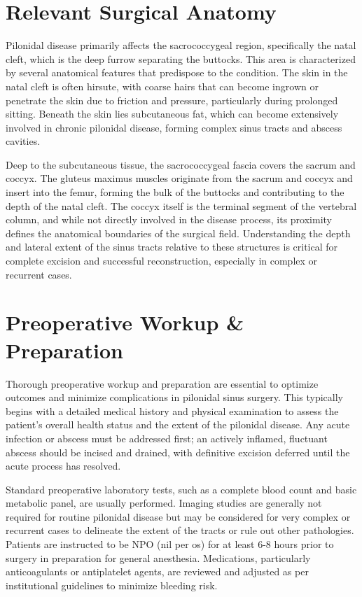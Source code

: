 \section*{Relevant Surgical Anatomy}
Pilonidal disease primarily affects the sacrococcygeal region, specifically the natal cleft, which is the deep furrow separating the buttocks. This area is characterized by several anatomical features that predispose to the condition. The skin in the natal cleft is often hirsute, with coarse hairs that can become ingrown or penetrate the skin due to friction and pressure, particularly during prolonged sitting. Beneath the skin lies subcutaneous fat, which can become extensively involved in chronic pilonidal disease, forming complex sinus tracts and abscess cavities.

Deep to the subcutaneous tissue, the sacrococcygeal fascia covers the sacrum and coccyx. The gluteus maximus muscles originate from the sacrum and coccyx and insert into the femur, forming the bulk of the buttocks and contributing to the depth of the natal cleft. The coccyx itself is the terminal segment of the vertebral column, and while not directly involved in the disease process, its proximity defines the anatomical boundaries of the surgical field. Understanding the depth and lateral extent of the sinus tracts relative to these structures is critical for complete excision and successful reconstruction, especially in complex or recurrent cases.

\section*{Preoperative Workup \& Preparation}
Thorough preoperative workup and preparation are essential to optimize outcomes and minimize complications in pilonidal sinus surgery. This typically begins with a detailed medical history and physical examination to assess the patient's overall health status and the extent of the pilonidal disease. Any acute infection or abscess must be addressed first; an actively inflamed, fluctuant abscess should be incised and drained, with definitive excision deferred until the acute process has resolved.

Standard preoperative laboratory tests, such as a complete blood count and basic metabolic panel, are usually performed. Imaging studies are generally not required for routine pilonidal disease but may be considered for very complex or recurrent cases to delineate the extent of the tracts or rule out other pathologies. Patients are instructed to be NPO (nil per os) for at least 6-8 hours prior to surgery in preparation for general anesthesia. Medications, particularly anticoagulants or antiplatelet agents, are reviewed and adjusted as per institutional guidelines to minimize bleeding risk.

